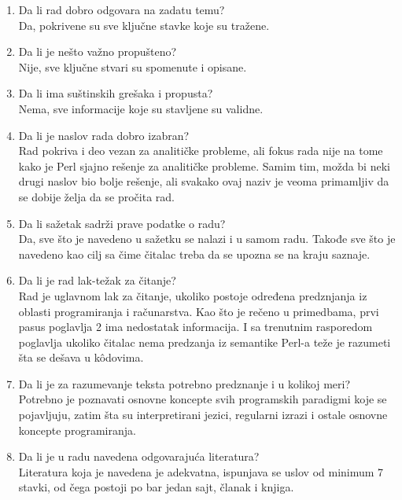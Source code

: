 \documentclass[a4paper]{report}
\begin{document}
\begin{enumerate}
\item Da li rad dobro odgovara na zadatu temu?\\
Da, pokrivene su sve ključne stavke koje su tražene. 

\item Da li je nešto važno propušteno?\\
Nije, sve ključne stvari su spomenute i opisane.

\item Da li ima suštinskih grešaka i propusta?\\
Nema, sve informacije koje su stavljene su validne.

\item Da li je naslov rada dobro izabran?\\
Rad pokriva i deo vezan za analitičke probleme, ali fokus rada nije na tome kako je Perl sjajno rešenje za analitičke probleme. Samim tim, možda bi neki drugi naslov bio bolje rešenje, ali svakako ovaj naziv je veoma primamljiv da se dobije želja da se pročita rad.

\item Da li sažetak sadrži prave podatke o radu?\\
Da, sve što je navedeno u sažetku se nalazi i u samom radu. Takođe sve što je navedeno kao cilj sa čime čitalac treba da se upozna se na kraju saznaje.

\item Da li je rad lak-težak za čitanje?\\
Rad je uglavnom lak za čitanje, ukoliko postoje određena predznjanja iz oblasti programiranja i računarstva. Kao što je rečeno u primedbama, prvi pasus poglavlja 2 ima nedostatak informacija. I sa trenutnim rasporedom poglavlja ukoliko čitalac nema predzanja iz semantike Perl-a teže je razumeti šta se dešava u k\^{o}dovima.

\item Da li je za razumevanje teksta potrebno predznanje i u kolikoj meri?\\
Potrebno je poznavati osnovne koncepte svih programskih paradigmi koje se pojavljuju, zatim šta su interpretirani jezici, regularni izrazi i ostale osnovne koncepte programiranja.

\item Da li je u radu navedena odgovarajuća literatura?\\
Literatura koja je navedena je adekvatna, ispunjava se uslov od minimum 7 stavki, od čega postoji po bar jedan sajt, članak i knjiga.


\end{enumerate}
\end{document}
